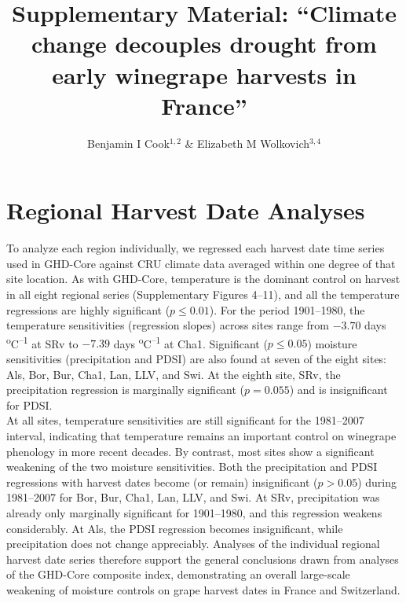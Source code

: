 \documentclass[12pt]{article}
\title{Supplementary Material: 
``Climate change decouples drought from early winegrape harvests in France''}
\author{Benjamin I Cook$^{1,2}$ \& Elizabeth M Wolkovich$^{3,4}$}
\begin{document}
\maketitle

\section*{Regional Harvest Date Analyses} %
\noindent To analyze each region individually, we regressed each harvest date time series used in GHD-Core against CRU climate data averaged within one degree of that site location. As with GHD-Core, temperature is the dominant control on harvest in all eight regional series (Supplementary Figures 4--11), and all the temperature regressions are highly significant ($p\le0.01$). For the period 1901--1980, the temperature sensitivities (regression slopes) across sites range from $-3.70$ days \textsuperscript{o}C\textsuperscript{--1} at SRv to $-7.39$ days \textsuperscript{o}C\textsuperscript{--1} at Cha1. Significant ($p\le0.05$) moisture sensitivities (precipitation and PDSI) are also found at seven of the eight sites: Als, Bor, Bur, Cha1, Lan, LLV, and Swi. At the eighth site, SRv, the precipitation regression is marginally significant ($p=0.055$) and is insignificant for PDSI.\\
\indent At all sites, temperature sensitivities are still significant for the 1981--2007 interval, indicating that temperature remains an important control on winegrape phenology in more recent decades. By contrast, most sites show a significant weakening of the two moisture sensitivities. Both the precipitation and PDSI regressions with harvest dates become (or remain) insignificant ($p>0.05$) during 1981--2007 for Bor, Bur, Cha1, Lan, LLV, and Swi. At SRv, precipitation was already only marginally significant for 1901--1980, and this regression weakens considerably. At Als, the PDSI regression becomes insignificant, while precipitation does not change appreciably. Analyses of the individual regional harvest date series therefore support the general conclusions drawn from analyses of the GHD-Core composite index, demonstrating an overall large-scale weakening of moisture controls on grape harvest dates in France and Switzerland.
\end{document}

